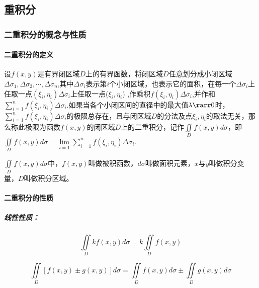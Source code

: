 \documentclass[
]{article}
\begin{document}
\hypertarget{ux91cdux79efux5206}{%
\subsection{重积分}\label{ux91cdux79efux5206}}

\hypertarget{ux4e8cux91cdux79efux5206ux7684ux6982ux5ff5ux4e0eux6027ux8d28}{%
\subsubsection{二重积分的概念与性质}\label{ux4e8cux91cdux79efux5206ux7684ux6982ux5ff5ux4e0eux6027ux8d28}}

\hypertarget{ux4e8cux91cdux79efux5206ux7684ux5b9aux4e49}{%
\paragraph{二重积分的定义}\label{ux4e8cux91cdux79efux5206ux7684ux5b9aux4e49}}

设\(f(x,y)\)是有界闭区域\(D\)上的有界函数，将闭区域\(D\)任意划分成小闭区域\(\Delta\sigma_1,\Delta\sigma_2,\cdots,\Delta\sigma_n\),其中\(\Delta \sigma_i\)表示第\(i\)个小闭区域，也表示它的面积，在每一个\(\Delta \sigma_i\)上任取一点\((\xi_i,\eta_i)\Delta \sigma_i\)上任取一点(\(\xi_i,\eta_i\))
,作乘积\(f(\xi_i,\eta_i)\Delta\sigma_i\),并作和\(\sum\limits_{i=1}^{n}f(\xi_i,\eta_i)\Delta \sigma_i\).如果当各个小闭区间的直径中的最大值\(\lambda\rarr 0\)时，\(\sum\limits_{i=1}^{n}f(\xi_i,\eta_i)\Delta \sigma_i\)的极限总存在，且与闭区域\(D\)的分法及点\(\xi_i,\eta_i\)的取法无关，那么称此极限为函数\(f(x,y)\)的闭区域\(D\)上的二重积分，记作\(\iint\limits_D f(x,y) d\sigma\)，即\(\iint\limits_D f(x,y) d\sigma=\lim\limits_{i=1} \sum\limits_{i=1}^n f(\xi_i,\eta_i)\Delta\sigma_i\).

\(\iint\limits_D f(x,y) d\sigma \)中，\(f(x,y)\)叫做被积函数，\(d\sigma\)叫做面积元素，\(x\)与\(y\)叫做积分变量，\(D\)叫做积分区域。

\hypertarget{ux4e8cux91cdux79efux5206ux7684ux6027ux8d28}{%
\paragraph{二重积分的性质}\label{ux4e8cux91cdux79efux5206ux7684ux6027ux8d28}}

\hypertarget{ux7ebfux6027ux6027ux8d28}{%
\subparagraph{线性性质：}\label{ux7ebfux6027ux6027ux8d28}}

\[\iint\limits_D kf(x,y) d\sigma = k \iint\limits_Df(x,y)\]

\[\iint\limits_D[f(x,y)\pm g(x,y)]d\sigma = \iint\limits_Df(x,y)d\sigma \pm \iint\limits_Dg(x,y)d\sigma\]
\end{document}
